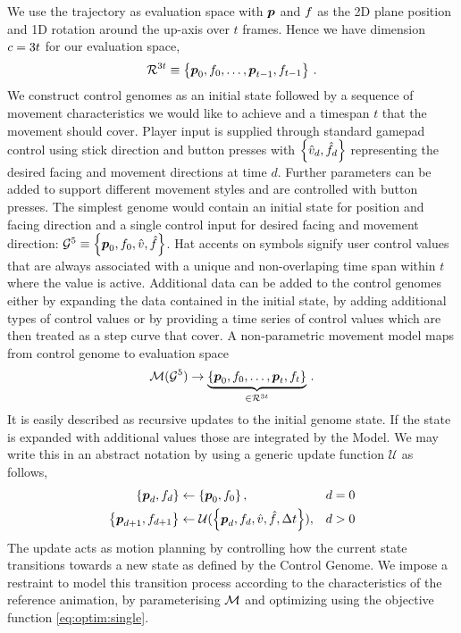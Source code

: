 We use the trajectory as evaluation space with $\boldsymbol{p }$ and $f$ as the 2D plane position and 1D rotation around the up-axis over $t$ frames. Hence we have dimension $c = 3 t$ for our evaluation space,
\begin{align}
\mathcal{R}^{3 t} 
\equiv 
\left\{
    \boldsymbol{p }_0,f_0,
    \ldots,
    \boldsymbol{p }_{t-1},f_{t-1}
    \right\} \,.
\end{align}
We construct control genomes as an initial state followed by a sequence of movement characteristics we would like to achieve and a timespan $t$ that the movement should cover. Player input is supplied through standard gamepad control using stick direction and button presses with $\left\{ \hat{v}_d, \hat{f}_d \right\}$ representing the desired facing and movement directions at time $d$. Further parameters can be added to support different movement styles and are controlled with button presses. The simplest genome would contain an initial state for position and facing direction and a single control input for desired facing and movement direction: $\mathcal{G}^5 \equiv \left\{ \boldsymbol{p }_0,f_0,\hat{v},\hat{f} \right\}$. Hat accents on symbols signify user control values that are always associated with a unique and non-overlaping time span within $t$ where the value is active. Additional data can be added to the control genomes either by expanding the data contained in the initial state, by adding additional types of control values or by providing a time series of control values which are then treated as a step curve that cover. A non-parametric movement model maps from control genome to evaluation space
\begin{equation}
    \mathcal{M}(\mathcal{G}^5)
    \rightarrow
    \underbrace{
    \left\{
    \boldsymbol{p }_0,f_0,\ldots,\boldsymbol{p }_{t},f_{t}\right\}
    }_{\in \mathcal{R}^{3t}}
    \,.
\end{equation}
It is easily described as recursive updates to the initial genome state. If the state is expanded with additional values those are integrated by the Model. 
We may write this in an abstract notation by using a generic update function $\mathcal{U}$ as follows,
\begin{subequations}
\begin{align}
    \left\{
    \boldsymbol{p }_d,f_d
    \right\}
    &\leftarrow
    \left\{
    \boldsymbol{p }_0,f_0    
    \right\},&d=0
    \\
    \left\{
    \boldsymbol{p }_{d+1},f_{d+1}
    \right\}
    &\leftarrow
    \mathcal{U}
    (
    \left\{
    \boldsymbol{p }_d,f_d,
    \hat{v},
    \hat{f},
    \Delta{t}
    \right\}
    )
    \label{eq:move:update},&d>0
\end{align}
\end{subequations}
The update acts as motion planning by controlling how the current state transitions towards a new state as defined by the Control Genome. We impose a restraint to model this transition process according to the characteristics of the reference animation, by parameterising $\mathcal{M}$ and optimizing using the objective function \eqref{eq:optim:single}. 

